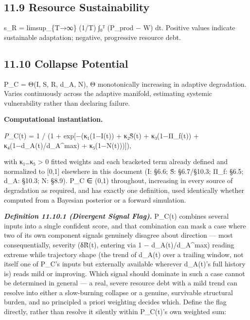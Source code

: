 \documentclass[
]{article}
\begin{document}
\hypertarget{resource-sustainability}{%
\subsection{11.9 Resource
Sustainability}\label{resource-sustainability}}

s\_R = limsup\_\{T→∞\} (1/T) ∫₀ᵀ (P\_prod − W) dt. Positive values
indicate sustainable adaptation; negative, progressive resource debt.

\hypertarget{collapse-potential}{%
\subsection{11.10 Collapse Potential}\label{collapse-potential}}

P\_C = Θ(I, S, R, d\_A, N), Θ monotonically increasing in adaptive
degradation. Varies continuously across the adaptive manifold,
estimating systemic vulnerability rather than declaring failure.

\textbf{Computational instantiation.}

\emph{P}\_C(t) = 1 / (1 + exp{[}−(κ₁(1−I(t)) + κ₂S̃(t) + κ₃(1−Π\_f(t)) +
κ₄(1−d\_A(t)/d\_A\^{}max) + κ₅(1−N(t))){]}),

with κ₁\ldots κ₅ \textgreater{} 0 fitted weights and each bracketed term
already defined and normalized to {[}0,1{]} elsewhere in this document
(I: §6.6; S̃: §6.7/§10.3; Π\_f: §6.5; d\_A: §10.3; N: §8.9). P\_C ∈ (0,1)
throughout, increasing in every source of degradation as required, and
has exactly one definition, used identically whether computed from a
Bayesian posterior or a forward simulation.

\emph{\textbf{Definition 11.10.1 (Divergent Signal Flag).}} P\_C(t)
combines several inputs into a single confident score, and that
combination can mask a case where two of its own component signals
genuinely disagree about direction --- most consequentially, severity
(δR̃(t), entering via 1 − d\_A(t)/d\_A\^{}max) reading extreme while
trajectory shape (the trend of d\_A(t) over a trailing window, not
itself one of P\_C's inputs but externally available wherever d\_A(t)'s
full history is) reads mild or improving. Which signal should dominate
in such a case cannot be determined in general --- a real, severe
resource debt with a mild trend can resolve into either a slow-burning
collapse or a genuine, survivable structural burden, and no principled a
priori weighting decides which. Define the flag directly, rather than
resolve it silently within P\_C(t)'s own weighted sum:
\end{document}
